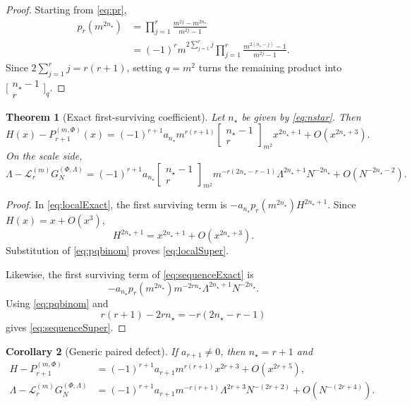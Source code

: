 \documentclass[11pt]{article}
\newtheorem{theorem}{Theorem}[section]
\newtheorem{corollary}[theorem]{Corollary}
\theoremstyle{remark}
\newcommand{\Lop}{\mathcal L}
\begin{document}
\begin{proof}
Starting from \eqref{eq:pr},
\begin{align*}
p_r(m^{2n_\star})
&=
\prod_{j=1}^r
\frac{m^{2j}-m^{2n_\star}}{m^{2j}-1}
\\
&=
(-1)^r m^{2\sum_{j=1}^rj}
\prod_{j=1}^r
\frac{m^{2(n_\star-j)}-1}{m^{2j}-1}.
\end{align*}
Since \(2\sum_{j=1}^rj=r(r+1)\), setting \(q=m^2\) turns the remaining
product into \(\bigl[\begin{smallmatrix}n_\star-1\\r\end{smallmatrix}\bigr]_q\).
\end{proof}

\begin{theorem}[Exact first-surviving coefficient]
\label{thm:super}
Let \(n_\star\) be given by \eqref{eq:nstar}.  Then
\begin{equation}
\boxed{
H(x)-P_{r+1}^{(m,\Phi)}(x)
=
(-1)^{r+1}a_{n_\star}
m^{r(r+1)}
\begin{bmatrix}n_\star-1\\r\end{bmatrix}_{m^2}
x^{2n_\star+1}
+
O(x^{2n_\star+3}).
}
\label{eq:localSuper}
\end{equation}
On the scale side,
\begin{equation}
\boxed{
\Lambda-
\Lop_r^{(m)}G_N^{(\Phi,\Lambda)}
=
(-1)^{r+1}a_{n_\star}
\begin{bmatrix}n_\star-1\\r\end{bmatrix}_{m^2}
m^{-r(2n_\star-r-1)}
\Lambda^{2n_\star+1}N^{-2n_\star}
+
O(N^{-2n_\star-2}).
}
\label{eq:sequenceSuper}
\end{equation}
\end{theorem}

\begin{proof}
In \eqref{eq:localExact}, the first surviving term is
\(-a_{n_\star} p_r(m^{2n_\star})H^{2n_\star+1}\).  Since \(H(x)=x+O(x^3)\),
\[
H^{2n_\star+1}=x^{2n_\star+1}+O(x^{2n_\star+3}).
\]
Substitution of \eqref{eq:pqbinom} proves \eqref{eq:localSuper}.

Likewise, the first surviving term of \eqref{eq:sequenceExact} is
\[
-a_{n_\star} p_r(m^{2n_\star})m^{-2rn_\star}
\Lambda^{2n_\star+1}N^{-2n_\star}.
\]
Using \eqref{eq:pqbinom} and
\[
r(r+1)-2rn_\star=-r(2n_\star-r-1)
\]
gives \eqref{eq:sequenceSuper}.
\end{proof}

\begin{corollary}[Generic paired defect]
\label{cor:generic}
If \(a_{r+1}\neq0\), then \(n_\star=r+1\) and
\begin{align}
H-P_{r+1}^{(m,\Phi)}
&=
(-1)^{r+1}a_{r+1}
m^{r(r+1)}x^{2r+3}
+O(x^{2r+5}),
\label{eq:genericLocal}
\\
\Lambda-
\Lop_r^{(m)}G_N^{(\Phi,\Lambda)}
&=
(-1)^{r+1}a_{r+1}
m^{-r(r+1)}
\Lambda^{2r+3}N^{-(2r+2)}
+O(N^{-(2r+4)}).
\label{eq:genericSequence}
\end{align}
\end{corollary}
\end{document}
